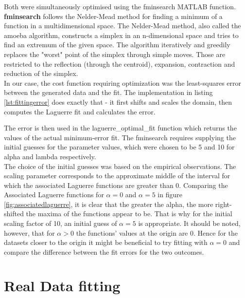 \documentclass[a4paper]{article}
\numberwithin{equation}{section}
\begin{document}
\noindent Both were simultaneously optimised using the fminsearch MATLAB function. \textbf{fminsearch} follows the Nelder-Mead method for finding a minimum of a function in a multidimensional space. The Nelder-Mead method, also called the amoeba algorithm, constructs a simplex in an n-dimensional space and tries to find an extremum of the given space. The algorithm iteratively and greedily replaces the "worst" point of the simplex through simple moves. Those are restricted to the reflection (through the centroid), expansion, contraction and reduction of the simplex. \\

\noindent In our case, the cost function requiring optimization was the least-squares error between the generated data and the fit. The implementation in listing \ref{lst:fittingerror} does exactly that - it first shifts and scales the domain, then computes the Laguerre fit and calculates the error.



\noindent The error is then used in the laguerre\_optimal\_fit function which returns the values of the actual minimum-error fit. The fminsearch requires supplying the initial guesses for the parameter values, which were chosen to be 5 and 10 for alpha and lambda respectively. \\

\noindent The choice of the initial guesses was based on the empirical observations. The scaling parameter corresponds to the approximate middle of the interval for which the associated Laguerre functions are greater than 0.
Comparing the Associated Laguerre functions for $\alpha = 0$ and $\alpha = 5$ in figure \ref{fig:associatedlaguerre}, it is clear that the greater the alpha, the more right-shifted the maxima of the functions appear to be. That is why for the initial scaling factor of 10, an initial guess of $\alpha = 5$ is appropriate. It should be noted, however, that for $\alpha > 0$ the functions' values at the origin are 0. Hence for the datasets closer to the origin it might be beneficial to try fitting with $\alpha = 0$ and compare the difference between the fit errors for the two outcomes.



\section{Real Data fitting}
\end{document}

